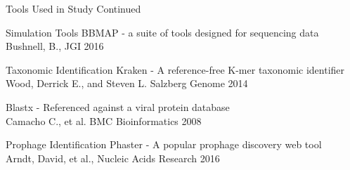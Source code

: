 \documentclass[11pt]{beamer}
\begin{document}
	
	\begin{frame}{Tools Used in Study Continued}
	\begin{block}{Simulation Tools}
	BBMAP - a suite of tools designed for sequencing data \\
	\tiny{Bushnell, B., JGI 2016}
	\end{block}
	
	\begin{block}{Taxonomic Identification}
	Kraken - A reference-free K-mer taxonomic identifier \\
	\tiny{Wood, Derrick E., and Steven L. Salzberg Genome 2014}
	
	\large{Blastx - Referenced against a viral protein database} \\
	\tiny{Camacho C., et al. BMC Bioinformatics 2008}
	\end{block}
	
	\begin{block}{Prophage Identification}
	Phaster - A popular prophage discovery web tool  \\
	\tiny{Arndt, David, et al., Nucleic Acids Research 2016}
	\end{block}
	\end{frame}
	
	
	
\end{document}
